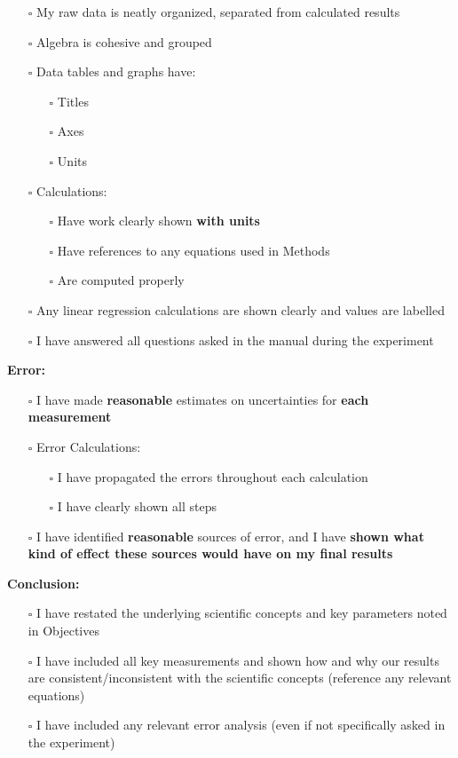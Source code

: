 \begin{itemize}
    \item[$\square$] My raw data is neatly organized, separated from calculated results
    \item[$\square$] Algebra is cohesive and grouped
    \item[$\square$] Data tables and graphs have:
	\begin{itemize}
	    \item[$\square$] Titles
	    \item[$\square$] Axes
	    \item[$\square$] Units
	\end{itemize}
    \item[$\square$] Calculations:
        \begin{itemize}
	    \item[$\square$] Have work clearly shown \textbf{with units}
	    \item[$\square$] Have references to any equations used in Methods
	    \item[$\square$] Are computed properly
	\end{itemize}
    \item[$\square$] Any linear regression calculations are shown clearly and values are labelled
    \item[$\square$] I have answered all questions asked in the manual during the experiment
\end{itemize}  
\textbf{Error:}
\begin{itemize}
    \item[$\square$] I have made \textbf{reasonable} estimates on uncertainties for \textbf{each measurement}
    \item[$\square$] Error Calculations:
        \begin{itemize}
	    \item[$\square$] I have propagated the errors throughout each calculation
	    \item[$\square$] I have clearly shown all steps
	\end{itemize}
    \item[$\square$] I have identified \textbf{reasonable} sources of error, and I have \textbf{shown what kind of effect these sources would have on my final results}
\end{itemize}  
\textbf{Conclusion:}
\begin{itemize}
    \item[$\square$] I have restated the underlying scientific concepts and key parameters noted in Objectives
    \item[$\square$] I have included all key measurements and shown how and why our results are consistent/inconsistent with the scientific concepts (reference any relevant equations)
    \item[$\square$] I have included any relevant error analysis (even if not specifically asked in the experiment)
\end{itemize}  


